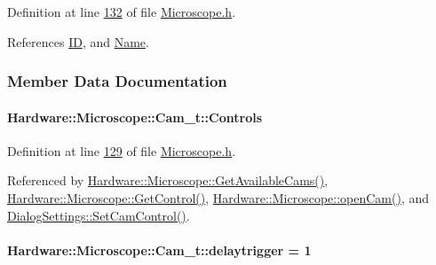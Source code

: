 Definition at line \hyperlink{_microscope_8h_source_l00132}{132} of file \hyperlink{_microscope_8h_source}{Microscope.\+h}.



References \hyperlink{_microscope_8h_source_l00125}{I\+D}, and \hyperlink{_microscope_8h_source_l00123}{Name}.



\subsubsection{Member Data Documentation}
\hypertarget{struct_hardware_1_1_microscope_1_1_cam__t_ab86ea92620f15288753a980b6f5d6c9f}{}
\paragraph[{Controls}]{ Hardware\+::\+Microscope\+::\+Cam\+\_\+t\+::\+Controls}\label{struct_hardware_1_1_microscope_1_1_cam__t_ab86ea92620f15288753a980b6f5d6c9f}


Definition at line \hyperlink{_microscope_8h_source_l00129}{129} of file \hyperlink{_microscope_8h_source}{Microscope.\+h}.



Referenced by \hyperlink{_microscope_8cpp_source_l00047}{Hardware\+::\+Microscope\+::\+Get\+Available\+Cams()}, \hyperlink{_microscope_8cpp_source_l00364}{Hardware\+::\+Microscope\+::\+Get\+Control()}, \hyperlink{_microscope_8cpp_source_l00167}{Hardware\+::\+Microscope\+::open\+Cam()}, and \hyperlink{dialogsettings_8cpp_source_l00262}{Dialog\+Settings\+::\+Set\+Cam\+Control()}.

\hypertarget{struct_hardware_1_1_microscope_1_1_cam__t_a097619bda34a25968a4ecf7bd1097405}{}
\paragraph[{delaytrigger}]{ Hardware\+::\+Microscope\+::\+Cam\+\_\+t\+::delaytrigger = 1}\label{struct_hardware_1_1_microscope_1_1_cam__t_a097619bda34a25968a4ecf7bd1097405}


